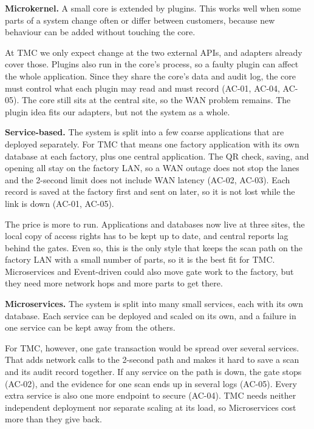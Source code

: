 \noindent\textbf{Microkernel.} A small core is extended by plugins. This works well when some parts of a system change often or differ between customers, because new behaviour can be added without touching the core.

At TMC we only expect change at the two external APIs, and adapters already cover those. Plugins also run in the core's process, so a faulty plugin can affect the whole application. Since they share the core's data and audit log, the core must control what each plugin may read and must record (AC-01, AC-04, AC-05). The core still sits at the central site, so the WAN problem remains. The plugin idea fits our adapters, but not the system as a whole.

\noindent\textbf{Service-based.} The system is split into a few coarse applications that are deployed separately. For TMC that means one factory application with its own database at each factory, plus one central application. The QR check, saving, and opening all stay on the factory LAN, so a WAN outage does not stop the lanes and the 2-second limit does not include WAN latency (AC-02, AC-03). Each record is saved at the factory first and sent on later, so it is not lost while the link is down (AC-01, AC-05).

The price is more to run. Applications and databases now live at three sites, the local copy of access rights has to be kept up to date, and central reports lag behind the gates. Even so, this is the only style that keeps the scan path on the factory LAN with a small number of parts, so it is the best fit for TMC. Microservices and Event-driven could also move gate work to the factory, but they need more network hops and more parts to get there.

\noindent\textbf{Microservices.} The system is split into many small services, each with its own database. Each service can be deployed and scaled on its own, and a failure in one service can be kept away from the others.

For TMC, however, one gate transaction would be spread over several services. That adds network calls to the 2-second path and makes it hard to save a scan and its audit record together. If any service on the path is down, the gate stops (AC-02), and the evidence for one scan ends up in several logs (AC-05). Every extra service is also one more endpoint to secure (AC-04). TMC needs neither independent deployment nor separate scaling at its load, so Microservices cost more than they give back.


